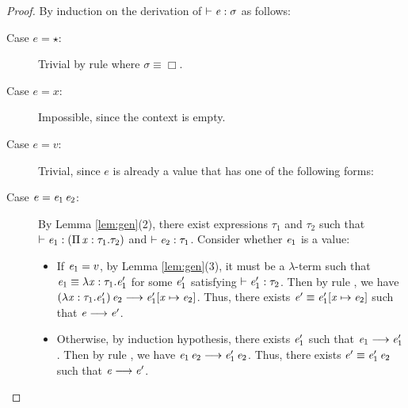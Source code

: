 \begin{proof}
    By induction on the derivation of $\vdash  \mathit{e}  :  \sigma$ as follows:
    \begin{description}
        \item[Case $e= \star $:] Trivial by rule  where $\sigma  \equiv  \Box$.
        \item[Case $e=x$:] Impossible, since the context is empty.
        \item[Case $e=v$:] Trivial, since $e$ is already a value that has one of the following forms:
		\begin{inparaenum}[(1)]
			\item $\lambda  \ottmv{x}  \ottsym{:}  \tau  \ottsym{.}  \ottnt{e}$,
			\item $\Pi \, \ottmv{x}  \ottsym{:}  \tau_{{\mathrm{1}}}  \ottsym{.}  \tau_{{\mathrm{2}}}$,
			\item $\kw{cast}^{\uparrow} \, \ottsym{[}  \tau  \ottsym{]}  \ottnt{e}$.
		\end{inparaenum}
		\item[Case $e=\mathit{e_{{\mathrm{1}}}} \, \mathit{e_{{\mathrm{2}}}}$:] By Lemma \ref{lem:gen}(2), there exist expressions $\tau_{{\mathrm{1}}}$ and $\tau_{{\mathrm{2}}}$ such that $\vdash  \mathit{e_{{\mathrm{1}}}}  :  (  \Pi \, \mathit{x}  :  \tau_{{\mathrm{1}}}  .  \tau_{{\mathrm{2}}}  )$ and $\vdash  \mathit{e_{{\mathrm{2}}}}  :  \tau_{{\mathrm{1}}}$. Consider whether $\mathit{e_{{\mathrm{1}}}}$ is a value:
    		\begin{itemize}
    		    \item If $\mathit{e_{{\mathrm{1}}}}=v$, by Lemma \ref{lem:gen}(3), it must be a $\lambda$-term such that $\mathit{e_{{\mathrm{1}}}}  \equiv  \lambda  \mathit{x}  :  \tau_{{\mathrm{1}}}  .  \mathit{e'_{{\mathrm{1}}}}$ for some $\mathit{e'_{{\mathrm{1}}}}$ satisfying $\vdash  \mathit{e'_{{\mathrm{1}}}}  :  \tau_{{\mathrm{2}}}$. Then by rule , we have $(  \lambda  \mathit{x}  :  \tau_{{\mathrm{1}}}  .  \mathit{e'_{{\mathrm{1}}}}  ) \, \mathit{e_{{\mathrm{2}}}}  \longrightarrow  \mathit{e'_{{\mathrm{1}}}}  [  \mathit{x}  \mapsto  \mathit{e_{{\mathrm{2}}}}  ]$. Thus, there exists $\mathit{e'}  \equiv  \mathit{e'_{{\mathrm{1}}}}  [  \mathit{x}  \mapsto  \mathit{e_{{\mathrm{2}}}}  ]$ such that $\mathit{e}  \longrightarrow  \mathit{e'}$.
    		    \item Otherwise, by induction hypothesis, there exists $\mathit{e'_{{\mathrm{1}}}}$ such that $\mathit{e_{{\mathrm{1}}}}  \longrightarrow  \mathit{e'_{{\mathrm{1}}}}$. Then by rule , we have $\mathit{e_{{\mathrm{1}}}} \, \mathit{e_{{\mathrm{2}}}}  \longrightarrow  \mathit{e'_{{\mathrm{1}}}} \, \mathit{e_{{\mathrm{2}}}}$. Thus, there exists $\mathit{e'}  \equiv  \mathit{e'_{{\mathrm{1}}}} \, \mathit{e_{{\mathrm{2}}}}$ such that $\mathit{e}  \longrightarrow  \mathit{e'}$.

\end{itemize}
\end{description}
\end{proof}
